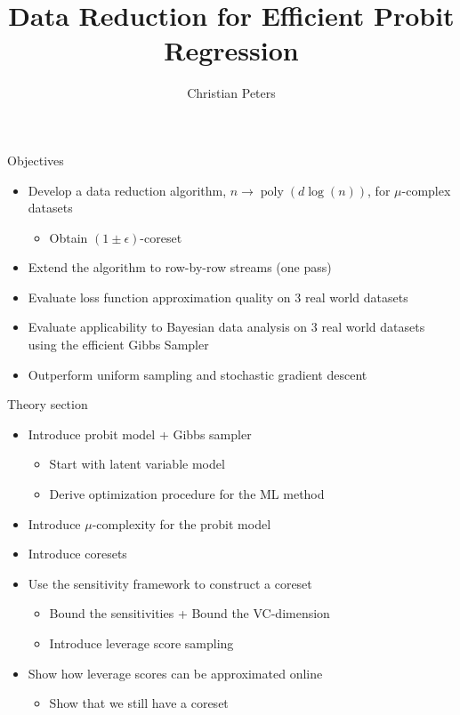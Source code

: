 \documentclass[gray]{beamer}
\title{Data Reduction for Efficient Probit Regression}
\author{Christian Peters}
\begin{document}
\maketitle

\begin{frame}{Objectives}
    \begin{itemize}
        \item Develop a data reduction algorithm, $n \rightarrow \operatorname{poly}(d \log(n))$,
              for $\mu$-complex datasets
              \begin{itemize}
                  \item Obtain $(1 \pm \epsilon)$-coreset
              \end{itemize}
        \item Extend the algorithm to row-by-row streams (one pass)
        \item Evaluate loss function approximation quality on 3 real world datasets
        \item Evaluate applicability to Bayesian data analysis on 3 real world datasets
              using the efficient Gibbs Sampler
        \item Outperform uniform sampling and stochastic gradient descent
    \end{itemize}
\end{frame}

\begin{frame}{Theory section}
    \begin{itemize}
        \item Introduce probit model + Gibbs sampler
              \begin{itemize}
                  \item Start with latent variable model
                  \item Derive optimization procedure for the ML method
              \end{itemize}
        \item Introduce $\mu$-complexity for the probit model
        \item Introduce coresets
        \item Use the sensitivity framework to construct a coreset
              \begin{itemize}
                  \item Bound the sensitivities + Bound the VC-dimension
                  \item Introduce leverage score sampling
              \end{itemize}
        \item Show how leverage scores can be approximated online
              \begin{itemize}
                  \item Show that we still have a coreset
              \end{itemize}
    \end{itemize}
\end{frame}
\end{document}
